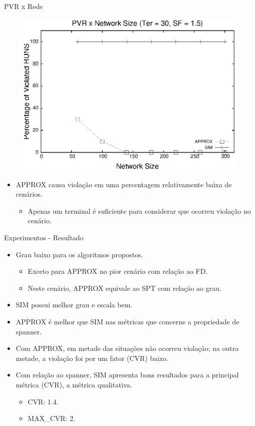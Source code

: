 \documentclass[10pt]{beamer}
\begin{document}
\begin{frame}{PVR x Rede}
\begin{figure}[H]
\centering
\includegraphics[scale=0.60]{imagens/defesa-pvr_rede}
\label{fig:pvr_rede}
\end{figure}
\begin{itemize}
  \item APPROX causa violação em uma percentagem relativamente baixa de cenários.
  \begin{itemize}
    \item Apenas um terminal é suficiente para considerar que ocorreu violação no cenário.
  \end{itemize}
\end{itemize}
\end{frame}

\begin{frame}{Experimentos - Resultado}
\begin{itemize}
  \item <1-> Grau baixo para os algoritmos propostos.
  \begin{itemize}
    \item <2-> Exceto para APPROX no pior cenário com relação ao FD.
    \item <2-> Neste cenário, APPROX equivale ao SPT com relação ao grau.
  \end{itemize}
  \item <3-> SIM possui melhor grau e escala bem.
  \item <4-> APPROX é melhor que SIM nas métricas que concerne a propriedade de spanner.
  \item <5-> Com APPROX, em metade das situações não ocorreu violação; na outra metade, a violação foi por um fator (CVR) baixo.
  \item <6-> Com relação ao spanner, SIM apresenta bons resultados para a principal métrica (CVR), a métrica qualitativa.
  \begin{itemize}
    \item <6-> CVR: 1.4.
    \item <6-> MAX\_CVR: 2.
  \end{itemize}
\end{itemize}
\end{frame}
\end{document}
